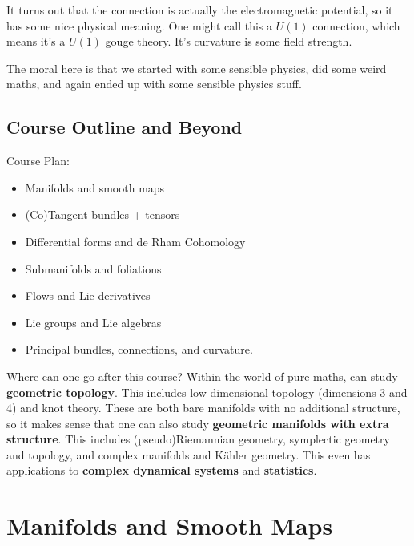 It turns out that the connection is actually the electromagnetic potential, so it has some nice physical meaning. One might call this a $U(1)$ connection, which means it's a $U(1)$ gouge theory. It's curvature is some field strength.

The moral here is that we started with some sensible physics, did some weird maths, and again ended up with some sensible physics stuff.

\subsection{Course Outline and Beyond}
\noindent Course Plan:
\begin{itemize}
	\item Manifolds and smooth maps
	\item (Co)Tangent bundles + tensors
	\item Differential forms and de Rham Cohomology
	\item Submanifolds and foliations
	\item Flows and Lie derivatives
	\item Lie groups and Lie algebras
	\item Principal bundles, connections, and curvature.
\end{itemize}
Where can one go after this course? Within the world of pure maths, can study \textbf{geometric topology}. This includes low-dimensional topology (dimensions 3 and 4) and knot theory. These are both bare manifolds with no additional structure, so it makes sense that one can also study \textbf{geometric manifolds with extra structure}. This includes (pseudo)Riemannian geometry, symplectic geometry and topology, and complex manifolds and K\"ahler geometry. This even has applications to \textbf{complex dynamical systems} and \textbf{statistics}.


\section{Manifolds and Smooth Maps}

